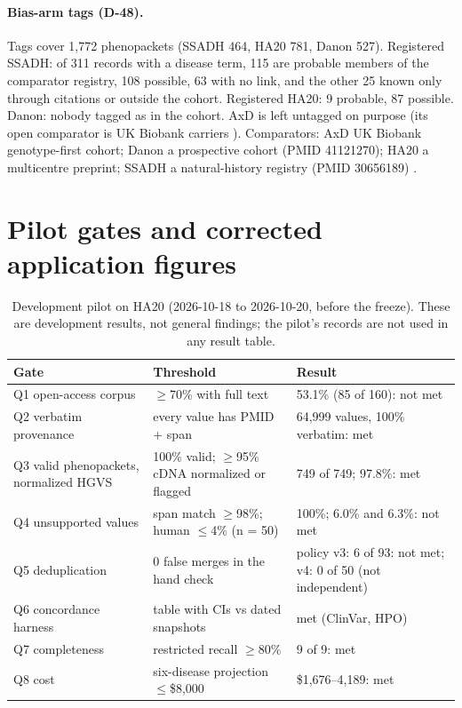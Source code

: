 \documentclass{article} %
\begin{document}
\paragraph{Bias-arm tags (D-48).} Tags cover 1,772 phenopackets (SSADH 464, HA20 781, Danon 527). Registered SSADH: of 311 records with a disease term, 115 are probable members of the comparator registry, 108 possible, 63 with no link, and the other 25 known only through citations or outside the cohort. Registered HA20: 9 probable, 87 possible. Danon: nobody tagged as in the cohort. AxD is left untagged on purpose (its open comparator is UK Biobank carriers \citep{gagliardi2024_axd_ukb}). Comparators: AxD UK Biobank genotype-first cohort; Danon a prospective cohort (PMID 41121270); HA20 a multicentre preprint; SSADH a natural-history registry (PMID 30656189) \citep{dibacco2019_ssadh_natural_history}.

\FloatBarrier
\section{Pilot gates and corrected application figures}
\label{app:pilot}
\begin{table}[!htbp]
\caption{Development pilot on HA20 (2026-10-18 to 2026-10-20, before the freeze). These are development results, not general findings; the pilot's records are not used in any result table.}
\begin{center}
\scriptsize
\begin{tabular}{lL{3.5cm}L{5.0cm}}
\toprule
Gate & Threshold & Result \\
\midrule
Q1 open-access corpus & $\geq$70\% with full text & 53.1\% (85 of 160): not met \\
Q2 verbatim provenance & every value has PMID + span & 64,999 values, 100\% verbatim: met \\
Q3 valid phenopackets, normalized HGVS & 100\% valid; $\geq$95\% cDNA normalized or flagged & 749 of 749; 97.8\%: met \\
Q4 unsupported values & span match $\geq$98\%; human $\leq$4\% (n = 50) & 100\%; 6.0\% and 6.3\%: not met \\
Q5 deduplication & 0 false merges in the hand check & policy v3: 6 of 93: not met; v4: 0 of 50 (not independent) \\
Q6 concordance harness & table with CIs vs dated snapshots & met (ClinVar, HPO) \\
Q7 completeness & restricted recall $\geq$80\% & 9 of 9: met \\
Q8 cost & six-disease projection $\leq$\$8,000 & \$1,676--4,189: met \\
\bottomrule
\end{tabular}
\end{center}
\end{table}
\end{document}
